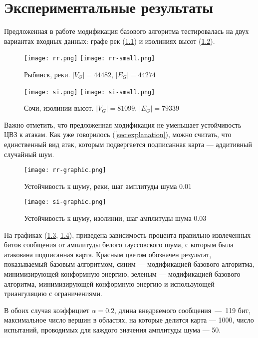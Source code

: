 \chapter{Экспериментальные результаты}

Предложенная в работе модификация базового алгоритма тестировалась на двух вариантах входных данных: графе рек (\ref{pic:rr}) и 
изолиниях высот (\ref{pic:si}).
\begin{figure}[h]
  \centerline {
    \mbox{\texttt{[image: rr.png]}}
    \mbox{\texttt{[image: rr-small.png]}}
  }
  \caption{Рыбинск, реки. $|V_G| = 44482$, $|E_G| = 44274$}
  \label{pic:rr}
\end{figure}
\begin{figure}[h]
  \centerline {
    \mbox{\texttt{[image: si.png]}}
    \mbox{\texttt{[image: si-small.png]}}
  }
  \caption{Сочи, изолинии высот. $|V_G| = 81099$, $|E_G| = 79339$}
  \label{pic:si}
\end{figure}

Важно отметить, что предложенная модификация не уменьшает устойчивость ЦВЗ к атакам. Как уже говорилось (\ref{sec:explanation}), 
можно считать, что единственный вид атак, которым подвергается подписанная карта --- аддитивный случайный шум.
\begin{figure} [p]
    \centerline {
        \texttt{[image: rr-graphic.png]}
    }
    \caption{Устойчивость к шуму, реки, шаг амплитуды шума 0.01}
    \label{pic:rr-graphic}
\end{figure}
\begin{figure} [p]
    \centerline {
        \texttt{[image: si-graphic.png]}
    }
    \caption{Устойчивость к шуму, изолинии, шаг амплитуды шума 0.03}
    \label{pic:si-graphic}
\end{figure}
На графиках (\ref{pic:rr-graphic}, \ref{pic:si-graphic}), приведена зависимость процента правильно извлеченных битов сообщения от амплитуды 
белого гауссовского шума, с которым была атакована подписанная карта. Красным цветом обозначен результат, показываемый базовым алгоритмом, 
синим --- модификацией базового алгоритма, минимизирующей конформную энергию, зеленым --- модификацией базового алгоритма, 
минимизирующей конформную энергию и использующей триангуляцию с ограничениями.

В обоих случая коэффициет $\alpha = 0.2$, длина внедряемого сообщения~---~119 бит,
максимальное число вершин в областях, на которые делится карта --- 1000, число испытаний, проводимых для каждого значения амплитуды шума --- 50.

